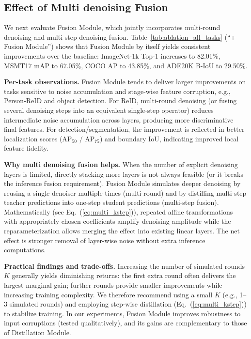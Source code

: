 \documentclass[conference]{IEEEtran}
\begin{document}
{\subsection{Effect of Multi denoising Fusion}
\label{sec:exp_multifusion}

We next evaluate Fusion Module, which jointly incorporates multi-round denoising and multi-step denoising fusion. Table~\ref{tab:ablation_all_tasks} (``+ Fusion Module'') shows that Fusion Module by itself yields consistent improvements over the baseline: ImageNet-1k Top-1 increases to 82.01\%, MSMT17 mAP to 67.05\%, COCO AP to 43.85\%, and ADE20K B-IoU to 29.50\%.

\textbf{Per-task observations.} Fusion Module tends to deliver larger improvements on tasks sensitive to noise accumulation and stage-wise feature corruption, e.g., Person-ReID and object detection. For ReID, multi-round denoising (or fusing several denoising steps into an equivalent single-step operator) reduces intermediate noise accumulation across layers, producing more discriminative final features. For detection/segmentation, the improvement is reflected in better localization scores (AP$_{50}$ / AP$_{75}$) and boundary IoU, indicating improved local feature fidelity.

\textbf{Why multi denoising fusion helps.} When the number of explicit denoising layers is limited, directly stacking more layers is not always feasible (or it breaks the inference fusion requirement). Fusion Module simulates deeper denoising by reusing a single denoiser multiple times (multi-round) and by distilling multi-step teacher predictions into one-step student predictions (multi-step fusion). Mathematically (see Eq.~(\ref{eq:multi_kstep})), repeated affine transformations with appropriately chosen coefficients amplify denoising amplitude while the reparameterization allows merging the effect into existing linear layers. The net effect is stronger removal of layer-wise noise without extra inference computations.

\textbf{Practical findings and trade-offs.} Increasing the number of simulated rounds $K$ generally yields diminishing returns: the first extra round often delivers the largest marginal gain; further rounds provide smaller improvements while increasing training complexity. We therefore recommend using a small $K$ (e.g., 1--3 simulated rounds) and employing step-wise distillation (Eq.~(\ref{eq:multi_kstep})) to stabilize training. In our experiments, Fusion Module improves robustness to input corruptions (tested qualitatively), and its gains are complementary to those of Distillation Module.

}
\end{document}
